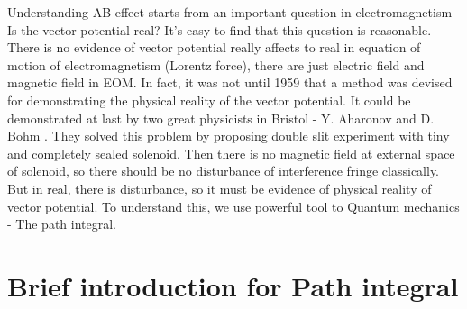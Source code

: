 \documentclass[%
 reprint,
 amsmath,amssymb,
 aps,
]{revtex4-1}
\begin{document}
Understanding AB effect starts from an important question in electromagnetism - Is the vector potential real? It's easy to find that this question is reasonable. There is no evidence of vector potential really affects to real in equation of motion of electromagnetism (Lorentz force), there are just electric field and magnetic field in EOM. In fact, it was not until 1959 that a method was devised for demonstrating the physical reality of the vector potential. It could be demonstrated at last by two great physicists in Bristol - Y. Aharonov and D. Bohm \cite{Aharonov}. They solved this problem by proposing double slit experiment with tiny and completely sealed solenoid. Then there is no magnetic field at external space of solenoid, so there should be no disturbance of interference fringe classically. But in real, there is disturbance, so it must be evidence of physical reality of vector potential. To understand this, we use powerful tool to Quantum mechanics - The path integral.\\

\section{\label{sec:level2}Brief introduction for Path integral}
\end{document}
